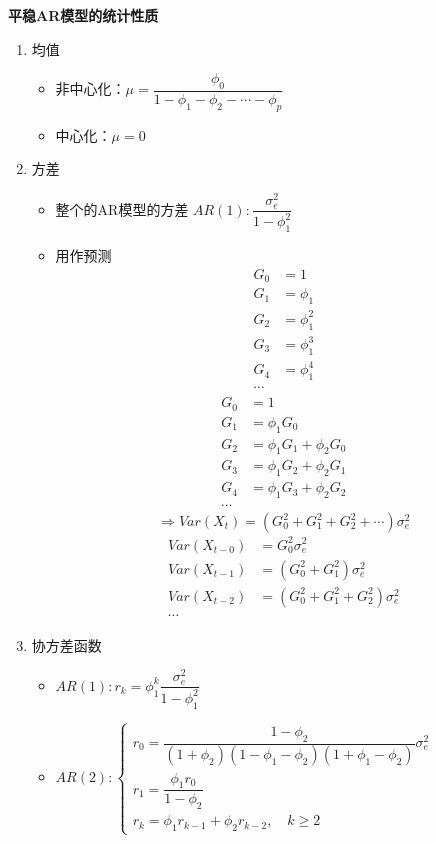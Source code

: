 \documentclass{article} %
\begin{document}
\textbf{平稳AR模型的统计性质}
\begin{enumerate}
\item 均值
\begin{itemize}
\item 非中心化：$\mu=\dfrac{\phi_0}{1-\phi_1-\phi_2-\cdots-\phi_p}$
\item 中心化：$\mu = 0$
\end{itemize}
\item 方差
\begin{itemize}
\item 整个的AR模型的方差
\(
AR(1):\dfrac{\sigma_e^2}{1-\phi_1^2}
\)
\item 用作预测
\[
\begin{aligned}
G_0&=1\\
G_1&=\phi_1\\
G_2&=\phi_1^2\\
G_3&=\phi_1^3\\
G_4&=\phi_1^4\\
\cdots
\end{aligned}
\]
\[
\begin{aligned}
G_0&=1\\
G_1&=\phi_1G_0\\
G_2&=\phi_1G_1+\phi_2G_0\\
G_3&=\phi_1G_2+\phi_2G_1\\
G_4&=\phi_1G_3+\phi_2G_2\\
\cdots
\end{aligned}
\]
\[
\Rightarrow Var(X_t)=(G_0^2+G_1^2+G_2^2+\cdots)\sigma_e^2
\]
\[
\begin{aligned}
Var(X_{t-0})&=G_0^2\sigma_e^2\\
Var(X_{t-1})&=(G_0^2+G_1^2)\sigma_e^2\\
Var(X_{t-2})&=(G_0^2+G_1^2+G_2^2)\sigma_e^2\\
\cdots
\end{aligned}
\]
\end{itemize}
\item 协方差函数
\begin{itemize}
\item $AR(1):r_k=\phi_1^k\dfrac{\sigma_e^2}{1-\phi_1^2}$
\item $AR(2):\begin{cases}
r_{0}=\dfrac{1-\phi_{2}}{(1+\phi_{2})(1-\phi_{1}-\phi_{2})(1+\phi_{1}-\phi_{2})}\sigma_e^2\\
r_{1}=\dfrac{\phi_{1}r_{0}}{1-\phi_{2}}\\
r_{k}=\phi_{1}r_{k-1}+\phi_{2}r_{k-2},\quad k\geq2
\end{cases}$

\end{itemize}
\end{enumerate}
\end{document}
